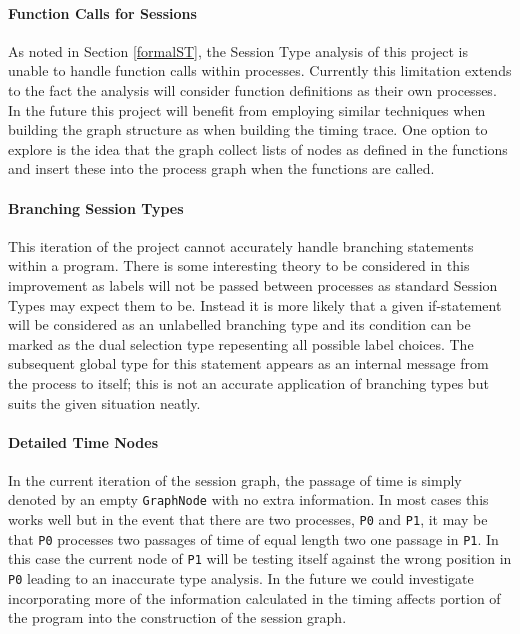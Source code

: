 \documentclass[11pt, abstracton, twoside, titlepage=true]{scrartcl}
\begin{document}
\paragraph{Function Calls for Sessions}
As noted in Section \ref{formalST}, the Session Type analysis of this project is 
unable to handle function calls within processes. Currently this limitation extends 
to the fact the analysis will consider function definitions as their own processes. 
In the future this project will benefit from employing similar techniques when 
building the graph structure as when building the timing trace. One option to explore 
is the idea that the graph collect lists of nodes as defined in the functions and 
insert these into the process graph when the functions are called. 

\paragraph{Branching Session Types}
This iteration of the project cannot accurately handle branching statements 
within a program. There is some interesting theory to be considered in this
improvement as labels will not be passed between processes as standard Session
Types may expect them to be. Instead it is more likely that a given if-statement
will be considered as an unlabelled branching type and its condition
can be marked as the dual selection type repesenting all possible label choices.
The subsequent global type for this statement appears as an internal message
from the process to itself; this is not an accurate application of branching
types but suits the given situation neatly.

\paragraph{Detailed Time Nodes}
In the current iteration of the session graph, the passage of time is simply
denoted by an empty \texttt{GraphNode} with no extra information. In most cases
this works well but in the event that there are two processes, \texttt{P0} and
\texttt{P1}, it may be that \texttt{P0} processes two passages of time of equal
length two one passage in \texttt{P1}. In this case the current node of 
\texttt{P1} will be testing itself against the wrong position in \texttt{P0} 
leading to an inaccurate type analysis. In the future we could investigate
incorporating more of the information calculated in the timing affects portion
of the program into the construction of the session graph.
\end{document}
